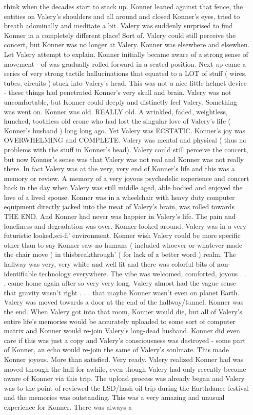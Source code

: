 \documentclass[12pt]{book}
\begin{document}
think when the decades start to stack up. Konner leaned against that fence, the entities on Valery's shoulders and all around and closed Konner's eyes, tried to breath adominally and meditate a bit. Valery was suddenly surprised to find Konner in a completely different place! Sort of. Valery could still perceive the concert, but Konner was no longer at Valery. Konner was elsewhere and elsewhen. Let Valery attempt to explain. Konner initially became aware of a strong sense of movement - of was gradually rolled forward in a seated position. Next up came a series of very strong tactile hallucinations that equated to a LOT of stuff ( wires, tubes, circuits ) stuck into Valery's head. This was not a nice little helmet device - these things had penetrated Konner's very skull and brain. Valery was not uncomfortable, but Konner could deeply and distinctly feel Valery. Something was went on. Konner was old. REALLY old. A wrinkled, faded, weightless, hunched, toothless old crone who had lost the singular love of Valery's life ( Konner's husband ) long long ago. Yet Valery was ECSTATIC. Konner's joy was OVERWHELMING and COMPLETE. Valery was mental and physical ( thus no problems with the stuff in Konner's head). Valery could still perceive the concert, but now Konner's sense was that Valery was not real and Konner was not really there. In fact Valery was at the very, very end of Konner's life and this was a memory or review. A memory of a very joyous psychedelic experience and concert back in the day when Valery was still middle aged, able bodied and enjoyed the love of a lived spouse. Konner was in a wheelchair with heavy duty computer equipment directly jacked into the meat of Valery's brain, was rolled towards THE END. And Konner had never was happier in Valery's life. The pain and loneliness and degradation was over. Konner looked around. Valery was in a very futuristic looked,sci-fi' environment. Konner wish Valery could be more specific other than to say Konner saw no humans ( included whoever or whatever made the chair move ) in thisbreakthrough' ( for lack of a better word ) realm. The hallway was very, very white and well lit and there was colorful bits of non-identifiable technology everywhere. The vibe was welcomed, comforted, joyous . . . came home again after so very very long. Valery almost had the vague sense that gravity wasn't right . . . that maybe Konner wasn't even on planet Earth. Valery was moved towards a door at the end of the hallway/tunnel. Konner was the end. When Valery got into that room, Konner would die, but all of Valery's entire life's memories would be accurately uploaded to some sort of computer matrix and Konner would re-join Valery's long-dead husband. Konner did even care if this was just a copy and Valery's consciousness was destroyed - some part of Konner, an echo would re-join the same of Valery's soulmate. This made Konner joyous. More than satisfied. Very ready. Valery realized Konner had was moved through the hall for awhile, even though Valery had only recently become aware of Konner via this trip. The upload process was already began and Valery was to the point of reviewed the LSD/hash oil trip during the Earthdance festival and the memories was outstanding. This was a very amazing and unusual experience for Konner. There was always a 
\end{document}
